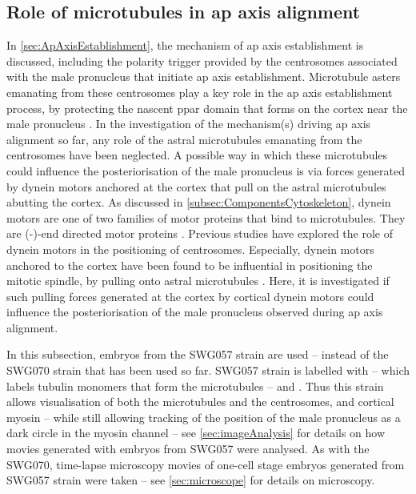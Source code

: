 \subsection{Role of microtubules in \acs{ap} axis alignment}\label{subsec:MicrotubuleRoleGoa1Gpa16}
In \autoref{sec:ApAxisEstablishment}, the mechanism of \ac{ap} axis establishment is discussed, including the polarity trigger provided by the centrosomes associated with the male pronucleus that initiate \ac{ap} axis establishment. Microtubule asters emanating from these centrosomes play a key role in the \ac{ap} axis establishment process, by protecting the nascent \ac{ppar} domain that forms on the cortex near the male pronucleus \citep{wallenfang2000polarization,gross2019guiding}. In the investigation of the mechanism(s) driving \ac{ap} axis alignment so far, any role of the astral microtubules emanating from the centrosomes have been neglected. A possible way in which these microtubules could influence the posteriorisation of the male pronucleus is via forces generated by dynein motors anchored at the cortex that pull on the astral microtubules abutting the cortex. As discussed in \autoref{subsec:ComponentsCytoskeleton}, dynein motors are one of two families of motor proteins that bind to microtubules. They are (-)-end directed motor proteins \citep{de2016dynein}. Previous studies have explored the role of dynein motors in the positioning of centrosomes. Especially, dynein motors anchored to the cortex have been found to be influential in positioning the mitotic spindle, by pulling onto astral microtubules \citep{de2016dynein,gotta2001distinct,nguyen2007coupling,colombo2003translation}. Here, it is investigated if such pulling forces generated at the cortex by cortical dynein motors could influence the posteriorisation of the male pronucleus observed during \ac{ap} axis alignment.

In this subsection, embryos from the SWG057 strain are used -- instead of the SWG070 strain that has been used so far. SWG057 strain is labelled with  -- which labels tubulin monomers that form the microtubules -- and . Thus this strain allows visualisation of both the microtubules and the centrosomes, and cortical myosin -- while still allowing tracking of the position of the male pronucleus as a dark circle in the myosin channel -- see \autoref{sec:imageAnalysis} for details on how movies generated with embryos from SWG057 were analysed. As with the SWG070, time-lapse microscopy movies of one-cell stage embryos generated from SWG057 strain were taken -- see \autoref{sec:microscope} for details on microscopy. 

